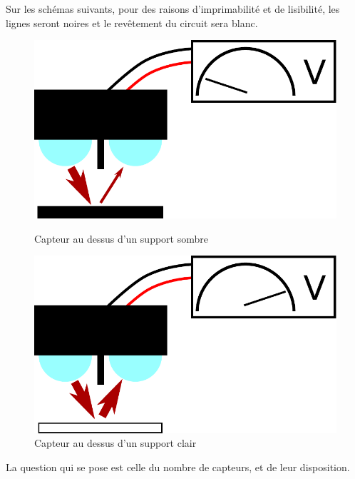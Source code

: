 		Sur les schémas suivants, pour des raisons d'imprimabilité et de lisibilité, les lignes seront noires et le revêtement du circuit sera blanc.\\

		\begin{figure}[ht!]
			\centering
			\begin{minipage}{0.48\textwidth}
				\centering
				\includegraphics[scale=0.45]{Graphics/capteurOptiqueFondNoir.pdf}
				\caption{Capteur au dessus d'un support sombre}
			\end{minipage}\hfill
			\begin{minipage}{0.48\textwidth}
				\centering
				\includegraphics[scale=0.45]{Graphics/capteurOptiqueFondBlanc.pdf}
				\caption{Capteur au dessus d'un support clair}
			\end{minipage}
		\end{figure}

		La question qui se pose est celle du nombre de capteurs, et de leur disposition.\\

